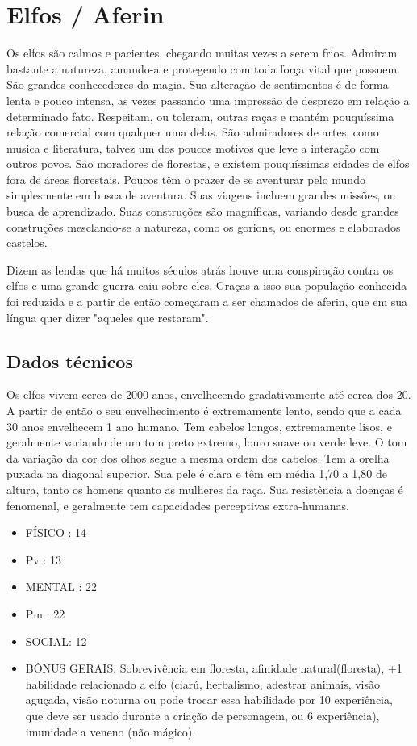 \section{Elfos / Aferin}

Os elfos são calmos e pacientes, chegando muitas vezes a serem frios. Admiram bastante a natureza, amando-a e protegendo com toda força vital que possuem. São grandes conhecedores da magia. Sua alteração de sentimentos é de forma lenta e pouco intensa, as vezes passando uma impressão de desprezo em relação a determinado fato. Respeitam, ou toleram, outras raças e mantém pouquíssima relação comercial com qualquer uma delas. São admiradores de artes, como musica e literatura, talvez um dos poucos motivos que leve a interação com outros povos. São moradores de florestas, e existem pouquíssimas cidades de elfos fora de áreas florestais.  Poucos têm o prazer de se aventurar pelo mundo simplesmente em busca de aventura. Suas viagens incluem grandes missões, ou busca de aprendizado. Suas construções são magníficas, variando desde grandes construções mesclando-se a natureza, como os gorions, ou enormes e elaborados castelos.

Dizem as lendas que há muitos séculos atrás houve uma conspiração contra os elfos e uma grande guerra caiu sobre eles. Graças a isso sua população conhecida foi reduzida e a partir de então começaram a ser chamados de aferin, que em sua língua quer dizer "aqueles que restaram". 


\subsection{Dados técnicos}

Os elfos vivem cerca de 2000 anos, envelhecendo gradativamente até cerca dos 20. A partir de então o seu envelhecimento é extremamente lento, sendo que a cada 30 anos envelhecem 1 ano humano. Tem cabelos longos, extremamente lisos, e geralmente variando de um tom preto extremo, louro suave ou verde leve. O tom da variação da cor dos olhos segue a mesma ordem dos cabelos. Tem a orelha puxada na diagonal superior. Sua pele é clara e têm em média 1,70 a 1,80 de altura, tanto os homens quanto as mulheres da raça. Sua resistência a doenças é fenomenal, e geralmente tem capacidades perceptivas extra-humanas.

\begin{itemize}
	\item FÍSICO : 14
	\item Pv : 13 

	\item MENTAL : 22
	\item Pm : 22
	\item SOCIAL: 12

	\item BÔNUS GERAIS: Sobrevivência em floresta, afinidade natural(floresta), +1 habilidade relacionado a elfo (ciarú, herbalismo, adestrar animais, visão aguçada, visão noturna ou pode trocar essa habilidade por 10 experiência, que deve ser usado durante a criação de personagem, ou 6 experiência), imunidade a veneno (não mágico). 
\end{itemize}

